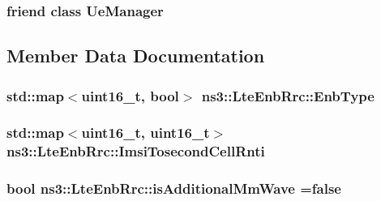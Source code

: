 \subsubsection[{\texorpdfstring{Ue\+Manager}{UeManager}}]{\setlength{\rightskip}{0pt plus 5cm}friend class {\bf Ue\+Manager}\hspace{0.3cm}{\ttfamily [friend]}}\hypertarget{classns3_1_1LteEnbRrc_a033aca790957c4d812831b4f1901de4b}{}\label{classns3_1_1LteEnbRrc_a033aca790957c4d812831b4f1901de4b}


\subsection{Member Data Documentation}
\subsubsection[{\texorpdfstring{Enb\+Type}{EnbType}}]{\setlength{\rightskip}{0pt plus 5cm}std\+::map$<$uint16\+\_\+t, bool$>$ ns3\+::\+Lte\+Enb\+Rrc\+::\+Enb\+Type}\hypertarget{classns3_1_1LteEnbRrc_acaae2a0038e440cc53930beb11753cd9}{}\label{classns3_1_1LteEnbRrc_acaae2a0038e440cc53930beb11753cd9}
\subsubsection[{\texorpdfstring{Imsi\+Tosecond\+Cell\+Rnti}{ImsiTosecondCellRnti}}]{\setlength{\rightskip}{0pt plus 5cm}std\+::map$<$uint16\+\_\+t, uint16\+\_\+t$>$ ns3\+::\+Lte\+Enb\+Rrc\+::\+Imsi\+Tosecond\+Cell\+Rnti}\hypertarget{classns3_1_1LteEnbRrc_a5075e20e106c127186f3a7f7d7e5cc9b}{}\label{classns3_1_1LteEnbRrc_a5075e20e106c127186f3a7f7d7e5cc9b}
\subsubsection[{\texorpdfstring{is\+Additional\+Mm\+Wave}{isAdditionalMmWave}}]{\setlength{\rightskip}{0pt plus 5cm}bool ns3\+::\+Lte\+Enb\+Rrc\+::is\+Additional\+Mm\+Wave ={\bf false}}\hypertarget{classns3_1_1LteEnbRrc_adea9720ee63acdd6ae2fbc660be809d1}{}\label{classns3_1_1LteEnbRrc_adea9720ee63acdd6ae2fbc660be809d1}
